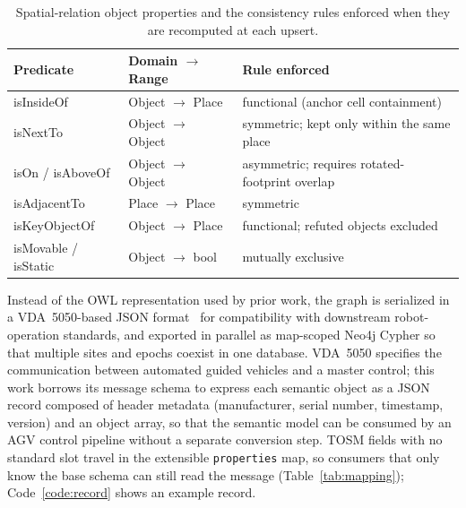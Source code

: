 \begin{table}[htbp]
  \centering
  \caption{Spatial-relation object properties and the consistency rules
  enforced when they are recomputed at each upsert.}
  \label{tab:predicates}
  \begin{tabularx}{\textwidth}{l l X}
    \toprule
    \textbf{Predicate} & \textbf{Domain $\to$ Range} & \textbf{Rule enforced} \\
    \midrule
    isInsideOf & Object $\to$ Place & functional (anchor cell containment) \\
    isNextTo & Object $\to$ Object & symmetric; kept only within the same place \\
    isOn / isAboveOf & Object $\to$ Object & asymmetric; requires rotated-footprint overlap \\
    isAdjacentTo & Place $\to$ Place & symmetric \\
    isKeyObjectOf & Object $\to$ Place & functional; refuted objects excluded \\
    isMovable / isStatic & Object $\to$ bool & mutually exclusive \\
    \bottomrule
  \end{tabularx}
\end{table}

Instead of the OWL representation used by prior work, the graph is serialized
in a VDA~5050-based JSON format~\cite{vda5050} for compatibility with downstream
robot-operation standards, and exported in parallel as map-scoped Neo4j Cypher
so that multiple sites and epochs coexist in one database. VDA~5050 specifies
the communication between automated guided vehicles and a master control; this
work borrows its message schema to express each semantic object as a JSON
record composed of header metadata (manufacturer, serial number, timestamp,
version) and an object array, so that the semantic model can be consumed by an
AGV control pipeline without a separate conversion step. TOSM fields with no
standard slot travel in the extensible \texttt{properties} map, so consumers
that only know the base schema can still read the message
(Table~\ref{tab:mapping}); Code~\ref{code:record} shows an example record.

